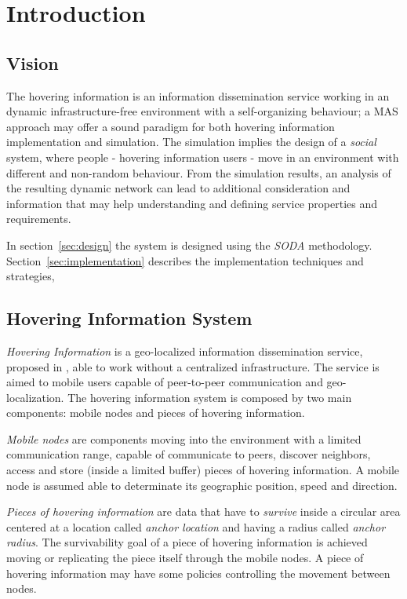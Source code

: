 \section{Introduction}

\subsection{Vision}

The hovering information is an information dissemination service working in an
dynamic infrastructure-free environment with a self-organizing behaviour; a MAS
approach may offer a sound paradigm for both hovering information
implementation and simulation. The simulation implies the design of a
\emph{social} system, where people - hovering information users - move in an
environment with different and non-random behaviour. From the simulation
results, an analysis of the resulting dynamic network can lead to additional
consideration and information that may help understanding and defining service
properties and requirements.

In section~\ref{sec:design} the system is designed using the \emph{SODA}
methodology. Section~\ref{sec:implementation} describes the implementation
techniques and strategies,

\subsection{Hovering Information System}

\emph{Hovering Information} is a geo-localized information dissemination
service, proposed in \cite{hover}, able to work without a centralized
infrastructure. The service is aimed to mobile users capable of peer-to-peer
communication and geo-localization. The hovering information system is composed
by two main components: mobile nodes and pieces of hovering information.

\emph{Mobile nodes} are components moving into the environment with a limited
communication range, capable of communicate to peers, discover neighbors,
access and store (inside a limited buffer) pieces of hovering information. A
mobile node is assumed able to determinate its geographic position, speed and
direction.

\emph{Pieces of hovering information} are data that have to \emph{survive}
inside a circular area centered at a location called \emph{anchor location} and
having a radius called \emph{anchor radius}. The survivability goal of a piece
of hovering information is achieved moving or replicating the piece itself
through the mobile nodes. A piece of hovering information may have some
policies controlling the movement between nodes.

